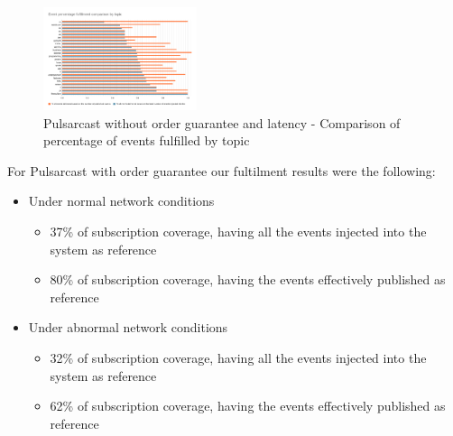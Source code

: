 \begin{figure}[!htb]
  \centering
  \includegraphics[width=0.4\textwidth]{img/graph-pulsarcast-latency-event-percentage-fulfillment-comparison.png}
  \caption{Pulsarcast without order guarantee and latency - Comparison of percentage of events fulfilled by topic}
  \label{fig:graph-pulsarcast-latency-event-percentage-fulfillment-comparison}
\end{figure}

For Pulsarcast with order guarantee our fultilment results were the following:
\begin{itemize}
\item Under normal network conditions
\begin{itemize}
  \item 37\% of subscription coverage, having all the events injected into the system as reference
  \item 80\% of subscription coverage, having the events effectively published as reference
\end{itemize}
\item Under abnormal network conditions
\begin{itemize}
  \item 32\% of subscription coverage, having all the events injected into the system as reference
  \item 62\% of subscription coverage, having the events effectively published as reference
\end{itemize}
\end{itemize}

